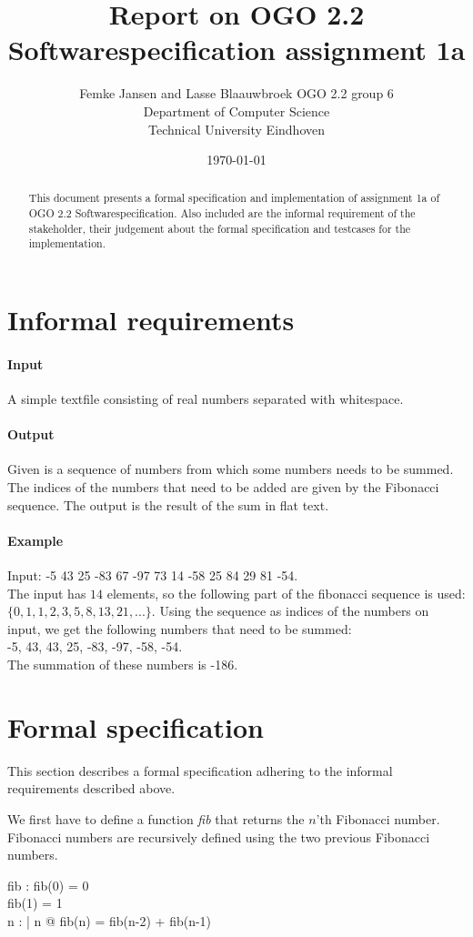 \documentclass[12pt]{article}
\title{Report on OGO 2.2 Softwarespecification assignment 1a}
\author{
        Femke Jansen and Lasse Blaauwbroek OGO 2.2 group 6 \\
                Department of Computer Science\\
        Technical University Eindhoven\\
}
\date{\today}
\begin{document}
\maketitle

\begin{abstract}
This document presents a formal specification and implementation of assignment 1a of OGO 2.2 Softwarespecification. Also included are the informal requirement of the stakeholder, their judgement about the formal specification and testcases for the implementation.
\end{abstract}

\section{Informal requirements}
\paragraph{Input} A simple textfile consisting of real numbers separated with whitespace.
\paragraph{Output} Given is a sequence of numbers from which some numbers needs to be summed. The indices of the numbers that need to be added are given by the Fibonacci sequence. The output is the result of the sum in flat text.
\paragraph{Example}
Input: -5 43 25 -83  67 -97  73  14  -58 25  84   29 81  -54.\\
The input has $14$ elements, so the following part of the fibonacci sequence is used: $\{0, 1, 1, 2, 3, 5, 8, 13, 21, ...\}$. Using the sequence as indices of the numbers on input, we get the following numbers that need to be summed: \\ -5, 43, 43, 25, -83, -97, -58, -54. \\ The summation of these numbers is -186.

\section{Formal specification}

This section describes a formal specification adhering to the informal requirements described above.

We first have to define a function  \textit{fib} that returns the $n$'th Fibonacci number. Fibonacci numbers are recursively defined using the two previous Fibonacci numbers.
\begin{axdef}
fib : \nat \fun \nat
\where
fib(0) = 0 \\
fib(1) = 1 \\
\forall n : \nat | n  @ fib(n) = fib(n-2) + fib(n-1)
\end{axdef}
\end{document}
